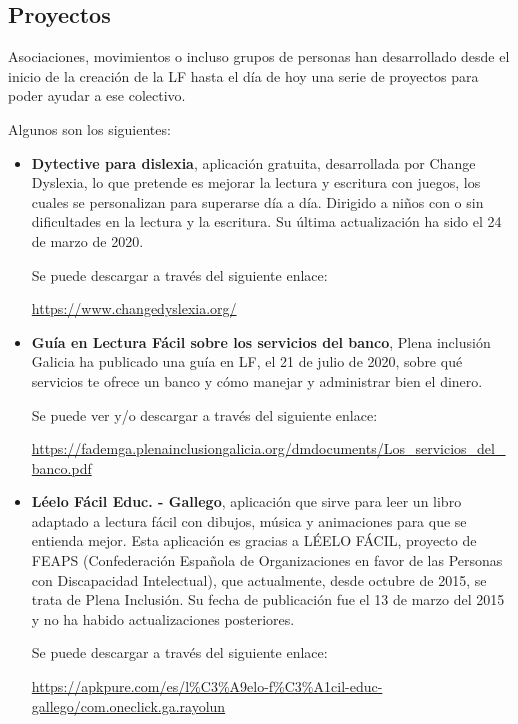 \subsection{Proyectos}
Asociaciones, movimientos o incluso grupos de personas han desarrollado desde el inicio de la creación de la LF hasta el día de hoy una serie de proyectos para poder ayudar a ese colectivo. 

Algunos son los siguientes:

\begin{itemize}
\item {\textbf{Dytective para dislexia}}, aplicación gratuita, desarrollada por Change Dyslexia, lo que pretende es mejorar la lectura y escritura con juegos, los cuales se personalizan para superarse día a día. Dirigido a niños con o sin dificultades en la lectura y la escritura. Su última actualización ha sido el 24 de marzo de 2020. 

Se puede descargar a través del siguiente enlace:

\href{https://www.changedyslexia.org/}{https://www.changedyslexia.org/}

\item {\textbf{Guía en Lectura Fácil sobre los servicios del banco}}, Plena inclusión Galicia ha publicado una guía en LF, el 21 de julio de 2020, sobre qué servicios te ofrece un banco y cómo manejar y administrar bien el dinero. 

Se puede ver y/o descargar a través del siguiente enlace:

\href{https://fademga.plenainclusiongalicia.org/dmdocuments/Los\_servicios\_del\_banco.pdf}{https://fademga.plenainclusiongalicia.org/dmdocuments/Los\_servicios\_del\_banco.pdf}


\item {\textbf{Léelo Fácil Educ. - Gallego}}, aplicación que sirve para leer un libro adaptado a lectura fácil con dibujos, música y animaciones para que se entienda mejor. Esta aplicación es gracias a LÉELO FÁCIL, proyecto de FEAPS (Confederación Española de Organizaciones en
favor de las Personas con Discapacidad Intelectual), que actualmente, desde octubre de 2015, se trata de Plena Inclusión. Su fecha de publicación fue el 13 de marzo del 2015 y no ha habido actualizaciones posteriores. 

Se puede descargar a través del siguiente enlace:

\href{https://apkpure.com/es/l\%C3\%A9elo-f\%C3\%A1cil-educ-gallego/com.oneclick.ga.rayoluna}{https://apkpure.com/es/l\%C3\%A9elo-f\%C3\%A1cil-educ-gallego/com.oneclick.ga.rayolun}


\end{itemize}
